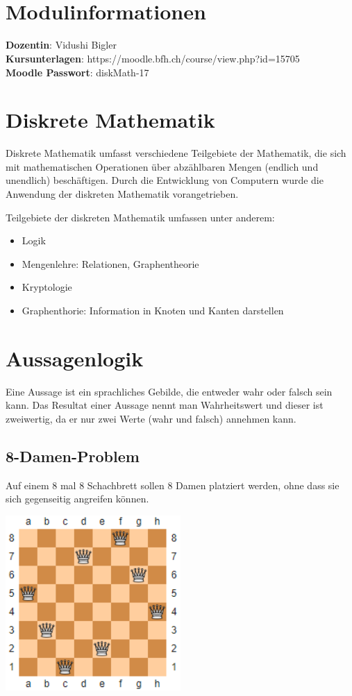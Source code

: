 \documentclass[12pt, a4paper, oneside]{article}
\title{\vspace{-1.5cm}\subjectIdentifier{}\\\subject{}}
\author{\vspace{-1.5cm}}
\date{\vspace{-1.5cm}}
\begin{document}
\maketitle
\thispagestyle{fancy}

\section{Modulinformationen}
{\bf Dozentin}: Vidushi Bigler\\
{\bf Kursunterlagen}: https://moodle.bfh.ch/course/view.php?id=15705\\
{\bf Moodle Passwort}: diskMath-17

\newpage
\section{Diskrete Mathematik}
Diskrete Mathematik umfasst verschiedene Teilgebiete der Mathematik, die sich mit mathematischen Operationen über abzählbaren Mengen (endlich und unendlich) beschäftigen. Durch die Entwicklung von Computern wurde die Anwendung der diskreten Mathematik vorangetrieben.

Teilgebiete der diskreten Mathematik umfassen unter anderem:
\begin{itemize}
  \item Logik
  \item Mengenlehre: Relationen, Graphentheorie
  \item Kryptologie
  \item Graphenthorie: Information in Knoten und Kanten darstellen
\end{itemize}

\newpage
\section{Aussagenlogik}
Eine Aussage ist ein sprachliches Gebilde, die entweder wahr oder falsch sein kann. Das Resultat einer Aussage nennt man Wahrheitswert und dieser ist zweiwertig, da er nur zwei Werte (wahr und falsch) annehmen kann.

\subsection{8-Damen-Problem}
Auf einem 8 mal 8 Schachbrett sollen 8 Damen platziert werden, ohne dass sie sich gegenseitig angreifen können.

\begin{center}
  \includegraphics[width=0.5\textwidth]{8queens.png}
\end{center}
\end{document}
